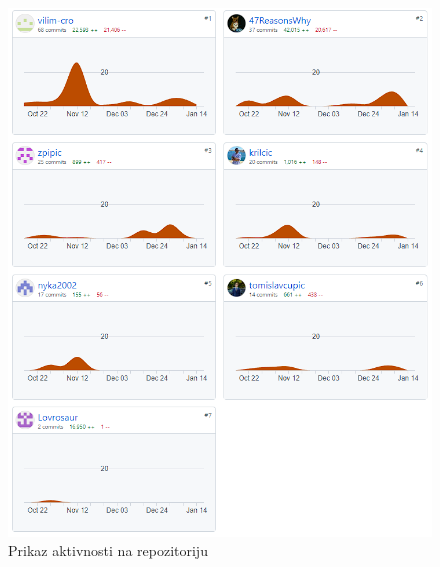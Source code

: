 		\begin{figure}[H]
			\includegraphics[width=\textwidth]{slike/git_aktivnost.png}
			\caption{Prikaz aktivnosti na repozitoriju}
			\label{fig:aktivnost}
		\end{figure}
		\eject 
	
